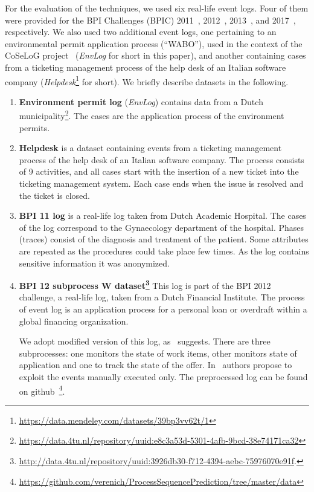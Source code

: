 For the evaluation of the techniques, we used six real-life event logs. Four of them were provided for the BPI Challenges (BPIC) 2011~\cite{bpichallenge2011}, 2012~\cite{bpichallenge2012}, 2013~\cite{bpichallenge2013}, and 2017~\cite{bpichallenge2017}, respectively. We also used two additional event logs, one pertaining to an environmental permit application process (``WABO''), used in the context of the CoSeLoG project~\cite{EnvironmentalLog} (\emph{EnvLog} for short in this paper), and another containing cases from a ticketing management process of the help desk of an Italian software company (\emph{Helpdesk}\footnote{\url{https://data.mendeley.com/datasets/39bp3vv62t/1}} for short). We briefly describe datasets in the following.


\begin{enumerate}
	\item \textbf{Environment permit log} (\emph{EnvLog}) contains data from a Dutch municipality\footnote{\url{https://data.4tu.nl/repository/uuid:e8c3a53d-5301-4afb-9bcd-38e74171ca32}}. The cases are the application process of the environment permits.
	\item \textbf{Helpdesk} is a dataset containing events from a ticketing management process of the help desk of an Italian software company. The process consists of 9 activities, and all cases start with the insertion of a new ticket into the ticketing management system. Each case ends when the issue is resolved and the ticket is closed.
	\item \textbf{BPI 11 log} is a real-life log taken from Dutch Academic Hospital. The cases of the log correspond to the Gynaecology department of the hospital. Phases (traces) consist of the diagnosis and treatment of the patient. Some attributes are repeated as the procedures could take place few times. As the log contains sensitive information it was anonymized.
	\item \textbf{BPI 12 subprocess W dataset\footnote{\url{http://data.4tu.nl/repository/uuid:3926db30-f712-4394-aebc-75976070e91f}.}} This log is part of the BPI 2012 challenge, a real-life log, taken from a Dutch Financial Institute. The process of event log is an application process for a personal loan or overdraft within a global financing organization.  
	
	We adopt modified version of this log, as~\cite{niek96732} suggests. There are three subprocesses: one monitors the state of work items, other monitors state of application and one to track the state of the offer. In~\cite{niek96732} authors propose to exploit the events manually executed only. The preprocessed log can be found on github~\footnote{\url{https://github.com/verenich/ProcessSequencePrediction/tree/master/data}}.
	

\end{enumerate}

